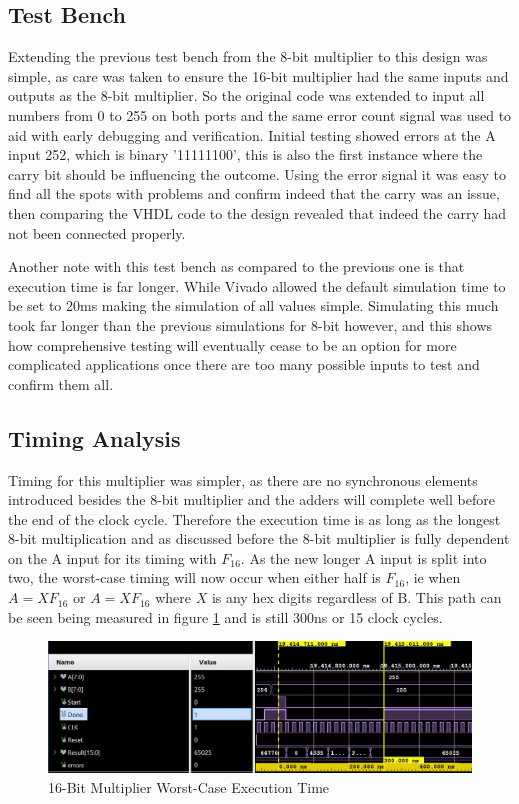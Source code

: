 \documentclass[11pt]{article}
\begin{document}
\subsection{Test Bench}
Extending the previous test bench from the 8-bit multiplier to this design was simple,
as care was taken to ensure the 16-bit multiplier had the same inputs and outputs as the 8-bit multiplier.
So the original code was extended to input all numbers from 0 to 255 on both ports and the same error count signal was used to aid with early debugging and verification.
Initial testing showed errors at the A input 252, which is binary '11111100', this is also the first instance where the carry bit should be influencing the outcome.
Using the error signal it was easy to find all the spots with problems and confirm indeed that the carry was an issue,
then comparing the VHDL code to the design revealed that indeed the carry had not been connected properly.

Another note with this test bench as compared to the previous one is that execution time is far longer.
While Vivado allowed the default simulation time to be set to 20ms making the simulation of all values simple.
Simulating this much took far longer than the previous simulations for 8-bit however, and this shows how comprehensive testing will eventually cease to be an option for more complicated applications once there are too many possible inputs to test and confirm them all.

\subsection{Timing Analysis}
Timing for this multiplier was simpler, as there are no synchronous elements introduced besides the 8-bit multiplier and the adders will complete well before the end of the clock cycle.
Therefore the execution time is as long as the longest 8-bit multiplication and as discussed before the 8-bit multiplier is fully dependent on the A input for its timing with $F_{16}$.
As the new longer A input is split into two, the worst-case timing will now occur when either half is $F_{16}$, ie when $A = XF_{16}$ or $A = XF_{16}$ where $X$ is any hex digits regardless of B.
This path can be seen being measured in figure \ref{fig:8bit_worst} and is still 300ns or 15 clock cycles.

\begin{figure}[H]         
    \centering
    \includegraphics[width=\textwidth]{16bit_worst.png}
    \caption{16-Bit Multiplier Worst-Case Execution Time}
    \label{fig:8bit_worst}
\end{figure} 
\end{document}
